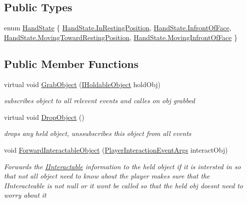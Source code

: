 \subsection*{Public Types}
\begin{DoxyCompactItemize}
\item 
enum \mbox{\hyperlink{class_player_hand_a1af76750da713cbc88856161d8d5ac0e}{Hand\+State}} \{ \mbox{\hyperlink{class_player_hand_a1af76750da713cbc88856161d8d5ac0eae9472019d82c6986ba42e1c6c9ddd812}{Hand\+State.\+In\+Resting\+Position}}, 
\mbox{\hyperlink{class_player_hand_a1af76750da713cbc88856161d8d5ac0ea0ffcf44fe0ab61c236ab3692a7cb3a22}{Hand\+State.\+Infront\+Of\+Face}}, 
\mbox{\hyperlink{class_player_hand_a1af76750da713cbc88856161d8d5ac0eae19d086cff66ea84fd45f01a2122af60}{Hand\+State.\+Moving\+Toward\+Resting\+Position}}, 
\mbox{\hyperlink{class_player_hand_a1af76750da713cbc88856161d8d5ac0eac9696ab2c297170cfe81d7ace9f096a6}{Hand\+State.\+Moving\+Infront\+Of\+Face}}
 \}
\end{DoxyCompactItemize}
\subsection*{Public Member Functions}
\begin{DoxyCompactItemize}
\item 
virtual void \mbox{\hyperlink{class_player_hand_a64a86af904a77f4a0b92d72bd5fdf43c}{Grab\+Object}} (\mbox{\hyperlink{interface_i_holdable_object}{I\+Holdable\+Object}} hold\+Obj)
\begin{DoxyCompactList}\small\item\em subscribes object to all relevent events and calles on obj grabbed \end{DoxyCompactList}\item 
virtual void \mbox{\hyperlink{class_player_hand_a3b127b846b420ef37cba3a3a8de68e78}{Drop\+Object}} ()
\begin{DoxyCompactList}\small\item\em drops any held object, unssubscribes this object from all events \end{DoxyCompactList}\item 
void \mbox{\hyperlink{class_player_hand_a67095e4c1db1e3369c435dd1fe1ebec5}{Forward\+Interactable\+Object}} (\mbox{\hyperlink{class_player_interaction_event_args}{Player\+Interaction\+Event\+Args}} interact\+Obj)
\begin{DoxyCompactList}\small\item\em Forwards the \mbox{\hyperlink{interface_i_interactable}{I\+Interactable}} information to the held object if it is intersted in so that not all object need to know about the player makes sure that the I\+Interacteable is not null or it wont be called so that the held obj doesn\textquotesingle{}t need to worry about it \end{DoxyCompactList}\end{DoxyCompactItemize}
